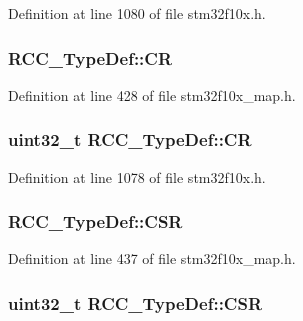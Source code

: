 Definition at line 1080 of file stm32f10x.\+h.

\subsubsection[{\texorpdfstring{CR}{CR}}]{ R\+C\+C\+\_\+\+Type\+Def\+::\+CR}\hypertarget{struct_r_c_c___type_def_a911ae74fe86ceb95e4a7c870de730c05}{}\label{struct_r_c_c___type_def_a911ae74fe86ceb95e4a7c870de730c05}


Definition at line 428 of file stm32f10x\+\_\+map.\+h.

\subsubsection[{\texorpdfstring{CR}{CR}}]{ {\bf uint32\+\_\+t} R\+C\+C\+\_\+\+Type\+Def\+::\+CR}\hypertarget{struct_r_c_c___type_def_abcb9ff48b9afb990283fefad0554b5b3}{}\label{struct_r_c_c___type_def_abcb9ff48b9afb990283fefad0554b5b3}


Definition at line 1078 of file stm32f10x.\+h.

\subsubsection[{\texorpdfstring{C\+SR}{CSR}}]{ R\+C\+C\+\_\+\+Type\+Def\+::\+C\+SR}\hypertarget{struct_r_c_c___type_def_aaae00a0fdb1f3f4cf0930d8729957023}{}\label{struct_r_c_c___type_def_aaae00a0fdb1f3f4cf0930d8729957023}


Definition at line 437 of file stm32f10x\+\_\+map.\+h.

\subsubsection[{\texorpdfstring{C\+SR}{CSR}}]{ {\bf uint32\+\_\+t} R\+C\+C\+\_\+\+Type\+Def\+::\+C\+SR}\hypertarget{struct_r_c_c___type_def_a7e913b8bf59d4351e1f3d19387bd05b9}{}\label{struct_r_c_c___type_def_a7e913b8bf59d4351e1f3d19387bd05b9}


